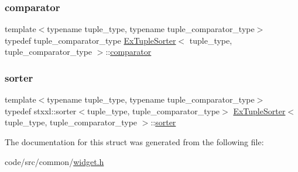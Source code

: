 \subsubsection{\texorpdfstring{comparator}{comparator}}
{\footnotesize\ttfamily template$<$typename tuple\+\_\+type, typename tuple\+\_\+comparator\+\_\+type$>$ \\
typedef tuple\+\_\+comparator\+\_\+type \hyperlink{struct_ex_tuple_sorter}{Ex\+Tuple\+Sorter}$<$ tuple\+\_\+type, tuple\+\_\+comparator\+\_\+type $>$\+::\hyperlink{struct_ex_tuple_sorter_a876d6fabe768a68b9d730053a619298e}{comparator}}

\mbox{\label{struct_ex_tuple_sorter_adf836f2aaa3d62d311b66eccbf5543d5}} 
\subsubsection{\texorpdfstring{sorter}{sorter}}
{\footnotesize\ttfamily template$<$typename tuple\+\_\+type, typename tuple\+\_\+comparator\+\_\+type$>$ \\
typedef stxxl\+::sorter$<$tuple\+\_\+type, tuple\+\_\+comparator\+\_\+type$>$ \hyperlink{struct_ex_tuple_sorter}{Ex\+Tuple\+Sorter}$<$ tuple\+\_\+type, tuple\+\_\+comparator\+\_\+type $>$\+::\hyperlink{struct_ex_tuple_sorter_adf836f2aaa3d62d311b66eccbf5543d5}{sorter}}



The documentation for this struct was generated from the following file\+:\begin{DoxyCompactItemize}
\item 
code/src/common/\hyperlink{widget_8h}{widget.\+h}\end{DoxyCompactItemize}

